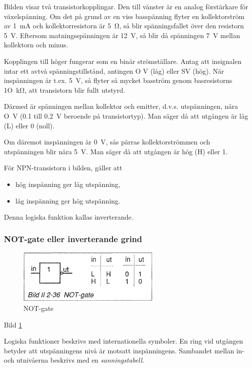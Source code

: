 Bilden visar två transistorkopplingar. Den till vänster är en analog förstärkare
för växelspänning. Om det på grund av en viss basspänning flyter en
kollektorström av 1~mA och kollektorresistorn är 5~Ω, så blir spänningsfallet
över den resistorn 5~V. Eftersom matningsspänningen är 12~V, så blir då
spänningen 7~V mellan kollektorn och minus.

Kopplingen till höger fungerar som en binär strömställare. Antag att insignalen
intar ett avtvå spänningstillstånd, antingen O V (låg) eller SV (hög). När
inspänningen är t.ex. 5~V, så flyter så mycket basström genom basresistorns
1O~kΩ, att transistorn blir fullt utstyrd.

Därmed är spänningen mellan kollektor och emitter, d.v.s. utspänningen, nära O~V
(0.1 till 0.2~V beroende på transistortyp). Man säger då att utgången är låg (L)
eller 0 (noll).

Om däremot inspänningen är 0~V, sås pärras kollektorströmmen och utspänningen
blir nära 5~V. Man säger då att utgången är hög (H) eller 1.

För NPN-transistorn i bilden, gäller att
\begin{itemize}
\item hög inspänning ger låg utspänning,
\item låg inspänning ger hög utspänning.
\end{itemize}
Denna logiska funktion kallas inverterande.

\subsubsection{NOT-gate eller inverterande grind}

\begin{figure}[h]
\begin{center}
\includegraphics[width=7cm]{images/bild_2_2-36}
\caption{NOT-gate}
\label{fig:BildII2-36}
\end{center}
\end{figure}

Bild \ref{fig:BildII2-36}

Logiska funktioner beskrivs med internationella symboler. En ring vid utgången
betyder att utspänningens nivå är motsatt inspänningens. Sambandet mellan in-
och utnivåerna beskrivs med en \emph{sanningstabell}.

